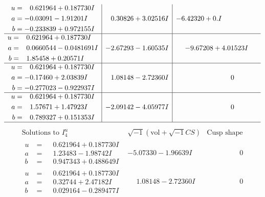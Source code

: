 \documentclass[1p]{elsarticle_modified}
\theoremstyle{definition}
\newcommand{\I}{\sqrt{-1}}
\begin{document}
$$\begin{array}{c|c|c}
\begin{aligned}
u &= \phantom{-}0.621964 + 0.187730 I \\
a &= -0.03091 - 1.91201 I \\
b &= -0.233839 + 0.972155 I\end{aligned}
 & \phantom{-}0.30826 + 3.02516 I & -6.42320 + 0. I\phantom{ +0.000000I} \\ \hline\begin{aligned}
u &= \phantom{-}0.621964 + 0.187730 I \\
a &= \phantom{-}0.0660544 - 0.0481691 I \\
b &= \phantom{-}1.85458 + 0.20571 I\end{aligned}
 & -2.67293 - 1.60535 I & -9.67208 + 4.01523 I \\ \hline\begin{aligned}
u &= \phantom{-}0.621964 + 0.187730 I \\
a &= -0.17460 + 2.03839 I \\
b &= -0.277023 - 0.922937 I\end{aligned}
 & \phantom{-}1.08148 - 2.72360 I & \phantom{-0.000000 } 0 \\ \hline\begin{aligned}
u &= \phantom{-}0.621964 + 0.187730 I \\
a &= \phantom{-}1.57671 + 1.47923 I \\
b &= \phantom{-}0.789327 + 0.151353 I\end{aligned}
 & -2.09142 - 4.05977 I & \phantom{-0.000000 } 0\\
 \hline 
 \end{array}$$\newpage$$\begin{array}{c|c|c}  
\text{Solutions to }I^u_{4}& \I (\text{vol} + \sqrt{-1}CS) & \text{Cusp shape}\\
 \hline 
\begin{aligned}
u &= \phantom{-}0.621964 + 0.187730 I \\
a &= \phantom{-}1.23483 - 1.98742 I \\
b &= \phantom{-}0.947343 + 0.488649 I\end{aligned}
 & -5.07330 - 1.96639 I & \phantom{-0.000000 } 0 \\ \hline\begin{aligned}
u &= \phantom{-}0.621964 + 0.187730 I \\
a &= \phantom{-}0.32744 + 2.47182 I \\
b &= \phantom{-}0.029164 - 0.289477 I\end{aligned}
 & \phantom{-}1.08148 - 2.72360 I & \phantom{-0.000000 } 0 \\ \hline\begin{aligned}

\end{aligned}
\end{array}$$
\end{document}
